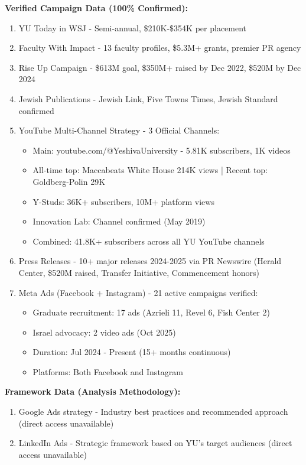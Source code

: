 \documentclass[12pt,letterpaper]{article}
\begin{document}
\textbf{Verified Campaign Data (100\% Confirmed):}
\begin{enumerate}[leftmargin=*]
    \item YU Today in WSJ - Semi-annual, \$210K-\$354K per placement
    \item Faculty With Impact - 13 faculty profiles, \$5.3M+ grants, premier PR agency
    \item Rise Up Campaign - \$613M goal, \$350M+ raised by Dec 2022, \$520M by Dec 2024
    \item Jewish Publications - Jewish Link, Five Towns Times, Jewish Standard confirmed
    \item YouTube Multi-Channel Strategy - 3 Official Channels:
    \begin{itemize}
        \item Main: youtube.com/@YeshivaUniversity - 5.81K subscribers, 1K videos
        \item All-time top: Maccabeats White House 214K views | Recent top: Goldberg-Polin 29K
        \item Y-Studs: 36K+ subscribers, 10M+ platform views
        \item Innovation Lab: Channel confirmed (May 2019)
        \item Combined: 41.8K+ subscribers across all YU YouTube channels
    \end{itemize}
    \item Press Releases - 10+ major releases 2024-2025 via PR Newswire (Herald Center, \$520M raised, Transfer Initiative, Commencement honors)
    \item Meta Ads (Facebook + Instagram) - 21 active campaigns verified:
    \begin{itemize}
        \item Graduate recruitment: 17 ads (Azrieli 11, Revel 6, Fish Center 2)
        \item Israel advocacy: 2 video ads (Oct 2025)
        \item Duration: Jul 2024 - Present (15+ months continuous)
        \item Platforms: Both Facebook and Instagram
    \end{itemize}
\end{enumerate}

\textbf{Framework Data (Analysis Methodology):}
\begin{enumerate}[leftmargin=*]
    \item Google Ads strategy - Industry best practices and recommended approach (direct access unavailable)
    \item LinkedIn Ads - Strategic framework based on YU's target audiences (direct access unavailable)
\end{enumerate}
\end{document}
